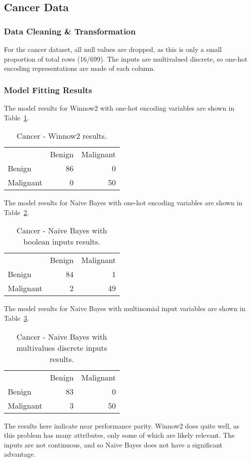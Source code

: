 \documentclass{amsart}
\begin{document}
\subsection{Cancer Data}
    \subsubsection*{Data Cleaning \& Transformation}
    For the cancer dataset, all null values are dropped, as this is only a small proportion of total rows (16/699).
    The inputs are multivalued discrete, so one-hot encoding representations are made of each column.
    \subsubsection*{Model Fitting Results}
    The model results for Winnow2 with one-hot encoding variables are shown in Table~\ref{cancer_winnow2}.
    \begin{table}
    \begin{tabular}{lrr}
    {} &  Benign  &   Malignant \\
    Benign &  86 &   0 \\
    Malignant &   0 &  50 \\
    \end{tabular}
    \caption{Cancer - Winnow2 results.}
    \label{cancer_winnow2}
    \end{table}
    The model results for Naive Bayes with one-hot encoding variables are shown in Table~\ref{cancer_nb_bool}.
    \begin{table}
    \begin{tabular}{lrr}
    {} &  Benign  &   Malignant \\
    Benign &  84 &   1 \\
    Malignant &   2 &  49 \\
    \end{tabular}
    \caption{Cancer - Naive Bayes with boolean inputs results.}
    \label{cancer_nb_bool}
    \end{table}
    The model results for Naive Bayes with multinomial input variables are shown in Table~\ref{cancer_nb}.
    \begin{table}
    \begin{tabular}{lrr}
    {} &  Benign  &   Malignant \\
    Benign &  83 &   0 \\
    Malignant &   3 &  50 \\
    \end{tabular}
    \caption{Cancer - Naive Bayes with multivalues discrete inputs results.}
    \label{cancer_nb}
    \end{table}
The results here indicate near performance parity. Winnow2 does quite well, as this problem has many attributes, only some
of which are likely relevant. The inputs are not continuous, and so Naive Bayes does not have a significant advantage.
\end{document}
